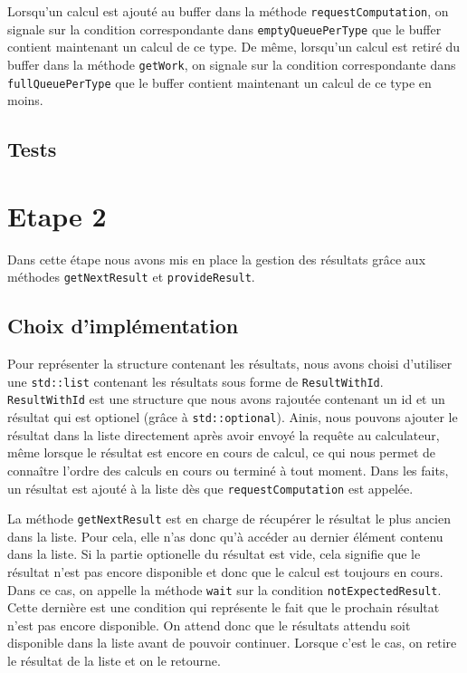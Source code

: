 \documentclass{article}
\begin{document}
Lorsqu'un calcul est ajouté au buffer dans la méthode \texttt{requestComputation}, on signale sur la condition correspondante
dans \texttt{emptyQueuePerType} que le buffer contient maintenant un calcul de ce type. De même, lorsqu'un calcul est
retiré du buffer dans la méthode \texttt{getWork}, on signale sur la condition correspondante dans \texttt{fullQueuePerType}
que le buffer contient maintenant un calcul de ce type en moins.

\subsection{Tests}

\section{Etape 2}
Dans cette étape nous avons mis en place la gestion des résultats grâce aux méthodes \texttt{getNextResult} et
\texttt{provideResult}.

\subsection{Choix d'implémentation}
Pour représenter la structure contenant les résultats, nous avons choisi d'utiliser une \texttt{std::list} contenant les
résultats sous forme de \texttt{ResultWithId}. \texttt{ResultWithId} est une structure que nous avons rajoutée
contenant un id et un résultat qui est optionel (grâce à \texttt{std::optional}). Ainis, nous pouvons ajouter le
résultat dans la liste directement après avoir envoyé la requête au calculateur, même lorsque le résultat est encore
en cours de calcul, ce qui nous permet de connaître l'ordre des calculs en cours ou terminé à tout moment. Dans les
faits, un résultat est ajouté à la liste dès que \texttt{requestComputation} est appelée.

La méthode \texttt{getNextResult} est en charge de récupérer le résultat le plus ancien dans la liste. Pour cela, elle
n'as donc qu'à accéder au dernier élément contenu dans la liste. Si la partie optionelle du résultat est vide, cela
signifie que le résultat n'est pas encore disponible et donc que le calcul est toujours en cours. Dans ce cas, on
appelle la méthode \texttt{wait} sur la condition \texttt{notExpectedResult}. Cette dernière est une condition qui
représente le fait que le prochain résultat n'est pas encore disponible. On attend donc que le résultats attendu
soit disponible dans la liste avant de pouvoir continuer. Lorsque c'est le cas, on retire le résultat de la liste et
on le retourne.
\end{document}
